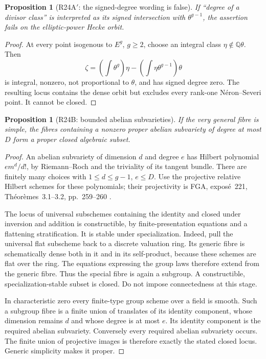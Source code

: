 \documentclass[11pt,a4paper]{article}
\newtheorem{proposition}[theorem]{Proposition}
\theoremstyle{definition}\newtheorem{definition}[theorem]{Definition}
\theoremstyle{remark}\newtheorem{remark}[theorem]{Remark}
\newcommand{\Q}{\mathbb Q}\newcommand{\Z}{\mathbb Z}\newcommand{\C}{\mathbb C}\newcommand{\R}{\mathbb R}
\begin{document}
\begin{proposition}[R24A$'$: the signed-degree wording is false]\label{R24Asigned}
If ``degree of a divisor class'' is interpreted as its signed intersection with $\theta^{g-1}$, the assertion fails on the elliptic-power Hecke orbit.
\end{proposition}
\begin{proof}
At every point isogenous to $E^g$, $g\ge2$, choose an integral class $\eta\notin\Q\theta$. Then
\[
 \zeta=\left(\int\theta^g\right)\eta
       -\left(\int\eta\theta^{g-1}\right)\theta
\]
is integral, nonzero, not proportional to $\theta$, and has signed degree zero. The resulting locus contains the dense orbit but excludes every rank-one N\'eron--Severi point. It cannot be closed.
\end{proof}

\begin{proposition}[R24B: bounded abelian subvarieties]\label{R24B}
If the very general fibre is simple, the fibres containing a nonzero proper abelian subvariety of degree at most $D$ form a proper closed algebraic subset.
\end{proposition}
\begin{proof}
An abelian subvariety of dimension $d$ and degree $e$ has Hilbert polynomial $em^d/d!$, by Riemann--Roch and the triviality of its tangent bundle. There are finitely many choices with $1\le d\le g-1$, $e\le D$. Use the projective relative Hilbert schemes for these polynomials; their projectivity is FGA, expos\'e~221, Th\'eor\`emes~3.1--3.2, pp.~259--260 \citep{FGA}.

The locus of universal subschemes containing the identity and closed under inversion and addition is constructible, by finite-presentation equations and a flattening stratification. It is stable under specialization. Indeed, pull the universal flat subscheme back to a discrete valuation ring. Its generic fibre is schematically dense both in it and in its self-product, because these schemes are flat over the ring. The equations expressing the group laws therefore extend from the generic fibre. Thus the special fibre is again a subgroup. A constructible, specialization-stable subset is closed. Do not impose connectedness at this stage.

In characteristic zero every finite-type group scheme over a field is smooth. Such a subgroup fibre is a finite union of translates of its identity component, whose dimension remains $d$ and whose degree is at most $e$. Its identity component is the required abelian subvariety. Conversely every required abelian subvariety occurs. The finite union of projective images is therefore exactly the stated closed locus. Generic simplicity makes it proper.
\end{proof}
\end{document}
